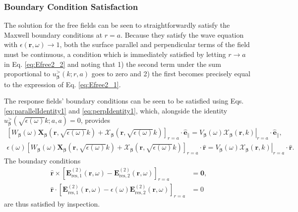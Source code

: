 \documentclass{article}
\begin{document}
\subsubsection{Boundary Condition Satisfaction}

The solution for the free fields can be seen to straightforwardly satisfy the Maxwell boundary conditions at $r = a$. Because they satisfy the wave equation with $\epsilon(\mathbf{r},\omega)\to1$, both the surface parallel and perpendicular terms of the field must be continuous, a condition which is immediately satisfied by letting $r\to a$ in Eq. \eqref{eq:Efree2_2} and noting that 1) the second term under the sum proportional to $u_{\bm{\beta}}^{>}(k;r,a)$ goes to zero and 2) the first becomes precisely equal to the expression of Eq. \eqref{eq:Efree2_1}.

The response fields' boundary conditions can be seen to be satisfied using Eqs. \eqref{eq:parallelIdentity1} and \eqref{eq:perpIdentity1}, which, alongside the identity $u_{\bm{\beta}}^>(\sqrt{\epsilon(\omega)}k;a,a) = 0$, provides
\begin{equation}
\begin{split}
\left[W_{\bm{\beta}}(\omega)\mathbf{X}_{\bm{\beta}}(\mathbf{r},\sqrt{\epsilon(\omega)}k) + \bm{\mathcal{X}}_{\bm{\beta}}(\mathbf{r},\sqrt{\epsilon(\omega)}k)\right]_{r= a}\cdot\hat{\mathbf{e}}_\parallel = \left.V_{\bm{\beta}}(\omega)\bm{\mathcal{X}}_{\bm{\beta}}(\mathbf{r},k)\right|_{r = a}\cdot\hat{\mathbf{e}}_\parallel,\\
\epsilon(\omega)\left[W_{\bm{\beta}}(\omega)\mathbf{X}_{\bm{\beta}}(\mathbf{r},\sqrt{\epsilon(\omega)}k) + \bm{\mathcal{X}}_{\bm{\beta}}(\mathbf{r},\sqrt{\epsilon(\omega)}k)\right]_{r= a}\cdot\hat{\mathbf{r}} = \left.V_{\bm{\beta}}(\omega)\bm{\mathcal{X}}_{\bm{\beta}}(\mathbf{r},k)\right|_{r = a}\cdot\hat{\mathbf{r}}.
\end{split}
\end{equation}
The boundary conditions
\begin{equation}
\begin{split}
\hat{\mathbf{r}}\times\left[\mathbf{E}_{\mathrm{res},1}^{(2)}(\mathbf{r},\omega) - \mathbf{E}_{\mathrm{res},2}^{(2)}(\mathbf{r},\omega)\right]_{r = a} &= \bm{0},\\
\hat{\mathbf{r}}\cdot\left[\mathbf{E}_{\mathrm{res},1}^{(2)}(\mathbf{r},\omega) - \epsilon(\omega)\mathbf{E}_{\mathrm{res},2}^{(2)}(\mathbf{r},\omega)\right]_{r = a} &= 0
\end{split}
\end{equation}
are thus satisfied by inspection.
\end{document}
